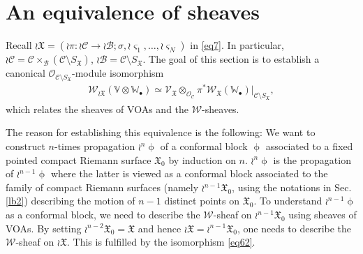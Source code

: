 \documentclass[12pt,a4paper,notitlepage]{article}
\theoremstyle{definition}
\theoremstyle{plain}
\newcommand{\fk}{\mathfrak}
\newcommand{\mc}{\mathcal}
\newcommand{\scr}{\mathscr}
\newcommand{\sgm}{\varsigma}
\newcommand{\SX}{{S_{\fk X}}}
\newcommand{\blt}{\bullet}
\newcommand{\Vbb}{\mathbb V}
\newcommand{\Wbb}{\mathbb W}
\numberwithin{equation}{section}
\begin{document}
\section{An equivalence of sheaves}\label{lb15}




Recall $\wr\fk X=(\wr\pi:\wr\mc C\rightarrow\wr\mc B;\sigma,\wr\sgm_1,\dots,\wr\sgm_N)$ in \eqref{eq7}. In particular, $\wr\mc C=\mc C\times_{\mc B}(\mc C\setminus\SX)$, $\wr\mc B=\mc C\setminus\SX$. The goal of this section is to establish a canonical $\scr O_{\mc C\setminus\SX}$-module isomorphism
\begin{align}
\scr W_{\wr\fk X}(\Vbb\otimes\Wbb_\blt)\simeq	\scr V_{\fk X}\otimes_{\scr O_{\mc C}}\pi^*\scr W_{\fk X}(\Wbb_\blt)|_{\mc C\setminus\SX}, \label{eq62}
\end{align}
which relates the sheaves of VOAs and the $\scr W$-sheaves.

The reason for establishing this equivalence is the following: We want to construct $n$-times propagation $\wr^n\upphi$ of a conformal block $\upphi$ associated to a fixed pointed compact Riemann surface $\fk X_0$ by induction on $n$. $\wr^n\upphi$ is the propagation of $\wr^{n-1}\upphi$ where the latter is viewed as a conformal block associated to the family of compact Riemann surfaces (namely $\wr^{n-1}\fk X_0$, using the notations in Sec. \ref{lb2}) describing the motion of $n-1$ distinct points on $\fk X_0$. To understand $\wr^{n-1}\upphi$ as a conformal block, we need to describe the $\scr W$-sheaf on $\wr^{n-1}\fk X_0$ using sheaves of VOAs. By setting $\wr^{n-2}\fk X_0=\fk X$ and hence $\wr\fk X=\wr^{n-1}\fk X_0$, one needs to describe the $\scr W$-sheaf on $\wr\fk X$. This is fulfilled by the isomorphism \eqref{eq62}.
\end{document}
